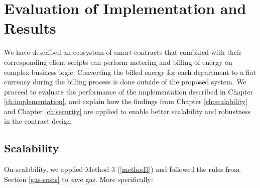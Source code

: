 \chapter{Evaluation of Implementation and Results}\label{ch:results}

We have described an ecosystem of smart contracts that combined with their corresponding client scripts can perform metering and billing of energy on complex business logic. Converting the billed energy for each department to a fiat currency during the billing process is done outside of the proposed system. We proceed to evaluate the performance of the implementation described in Chapter \ref{ch:implementation}, and explain how the findings from Chapter \ref{ch:scalability} and Chapter \ref{ch:security} are applied to enable better scalability and robustness in the contract design.

\section{Scalability}
On scalability, we applied Method 3 (\ref{method3}) and followed the rules from Section \ref{gas-costs} to save gas. More specifically:

